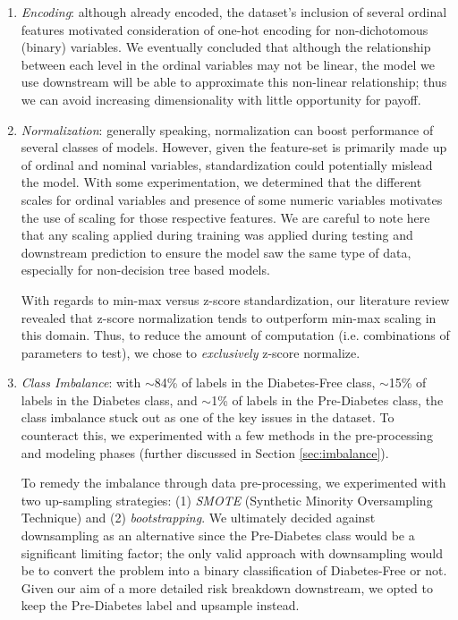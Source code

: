 \documentclass[conference]{IEEEtran}
\begin{document}
    \begin{enumerate}[label=\roman*.]
        \item \textit{Encoding}: although already encoded, the dataset's inclusion of several ordinal features motivated consideration of one-hot encoding for non-dichotomous (binary) variables. We eventually concluded that although the relationship between each level in the ordinal variables may not be linear, the model we use downstream will be able to approximate this non-linear relationship; thus we can avoid increasing dimensionality with little opportunity for payoff.
    
        \item \textit{Normalization}: generally speaking, normalization can  boost performance of several classes of models. However, given the feature-set is primarily made up of ordinal and nominal variables, standardization could potentially mislead the model. With some experimentation, we determined that the different scales for ordinal variables and presence of some numeric variables motivates the use of scaling for those respective features. We are careful to note here that any scaling applied during training was applied during testing and downstream prediction to ensure the model saw the same type of data, especially for non-decision tree based models.

        With regards to min-max versus z-score standardization, our literature review revealed that z-score normalization tends to outperform min-max scaling in this domain. Thus, to reduce the amount of computation (i.e. combinations of parameters to test), we chose to \textit{exclusively} z-score normalize.
        
        \item \textit{Class Imbalance}: with $\sim$84\% of labels in the Diabetes-Free class, $\sim$15\% of labels in the Diabetes class, and $\sim$1\% of labels in the Pre-Diabetes class, the class imbalance stuck out as one of the key issues in the dataset. To counteract this, we experimented with a few methods in the pre-processing and modeling phases (further discussed in Section \ref{sec:imbalance}).

        To remedy the imbalance through data pre-processing, we experimented with two up-sampling strategies: (1) \textit{SMOTE} (Synthetic Minority Oversampling Technique) and (2) \textit{bootstrapping}. We ultimately decided against downsampling as an alternative since the Pre-Diabetes class would be a significant limiting factor; the only valid approach with downsampling would be to convert the problem into a binary classification of Diabetes-Free or not. Given our aim of a more detailed risk breakdown downstream, we opted to keep the Pre-Diabetes label and upsample instead.
        

\end{enumerate}
\end{document}
